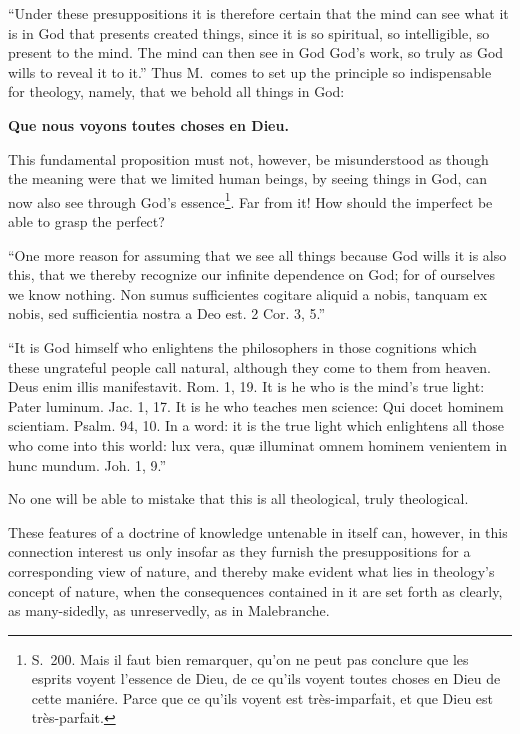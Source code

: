 \documentclass[12pt,a4paper]{article}
\begin{document}
``Under these presuppositions it is therefore certain that the mind can see what
it is in God that presents created things, since it is so spiritual, so
intelligible, so present to the mind. The mind can then see in God God's work, so
truly as God wills to reveal it to it.''
Thus M.\ comes to set up the principle so indispensable for theology, namely, that
we behold all things in God:

\begin{center}
\textbf{Que nous voyons toutes choses en Dieu.}
\end{center}

This fundamental proposition must not, however, be misunderstood as though the
meaning were that we limited human beings, by seeing things in God, can now also
see through God's essence\footnote{S.~200. Mais il faut bien remarquer, qu'on ne
peut pas conclure que les esprits voyent l'essence de Dieu, de ce qu'ils voyent
toutes choses en Dieu de cette maniére. Parce que ce qu'ils voyent est
très-imparfait, et que Dieu est très-parfait.}. Far from it! How should the
imperfect be able to grasp the perfect?

``One more reason for assuming that we see all things because God wills it is also
this, that we thereby recognize our infinite dependence on God; for of ourselves
we know nothing. Non sumus sufficientes cogitare aliquid a nobis, tanquam ex
nobis, sed sufficientia nostra a Deo est. 2 Cor. 3, 5.''

``It is God himself who enlightens the philosophers in those cognitions which
these ungrateful people call natural, although they come to them from heaven. Deus
enim illis manifestavit. Rom. 1, 19. It is he who is the mind's true light: Pater
luminum. Jac. 1, 17. It is he who teaches men science: Qui docet hominem
scientiam. Psalm. 94, 10. In a word: it is the true light which enlightens all
those who come into this world: lux vera, quæ illuminat omnem hominem venientem in
hunc mundum. Joh. 1, 9.''

No one will be able to mistake that this is all theological, truly theological.

These features of a doctrine of knowledge untenable in itself can, however, in
this connection interest us only insofar as they furnish the presuppositions for a
corresponding view of nature, and thereby make evident what
lies in theology's concept of nature, when the consequences contained in it are
set forth as clearly, as many-sidedly, as unreservedly, as in Malebranche.
\end{document}
